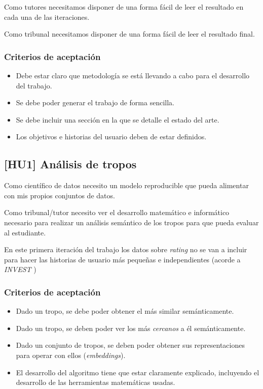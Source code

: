 Como tutores necesitamos disponer de una forma fácil de leer el resultado en cada
una de las iteraciones.

Como tribunal necesitamos disponer de una forma fácil de leer el resultado final.

\subsubsection{Criterios de aceptación}

\begin{itemize}
      \item Debe estar claro que metodología se está llevando a cabo para el desarrollo del trabajo.
      \item Se debe poder generar el trabajo de forma sencilla.
      \item Se debe incluir una sección en la que se detalle el estado del arte.
      \item Los objetivos e historias del usuario deben de estar definidos.
\end{itemize}

\subsection{[HU1] Análisis de tropos}

Como científico de datos necesito un modelo reproducible que pueda alimentar con mis propios
conjuntos de datos.

Como tribunal/tutor necesito ver el desarrollo matemático e informático necesario para realizar
un análisis semántico de los tropos para que pueda evaluar al estudiante.

En este primera iteración del trabajo los datos sobre \textit{rating} no se van a incluir para
hacer las historias de usuario más pequeñas e independientes (acorde a \textit{INVEST} \cite{buglione2013improving})

\subsubsection{Criterios de aceptación}

\begin{itemize}
      \item Dado un tropo, se debe poder obtener el más similar semánticamente.
      \item Dado un tropo, se deben poder ver los más \textit{cercanos} a él semánticamente.
      \item Dado un conjunto de tropos, se deben poder obtener sus representaciones para operar con ellos (\textit{embeddings}).
      \item El desarrollo del algoritmo tiene que estar claramente explicado, incluyendo el desarrollo de las herramientas matemáticas usadas.
\end{itemize}


